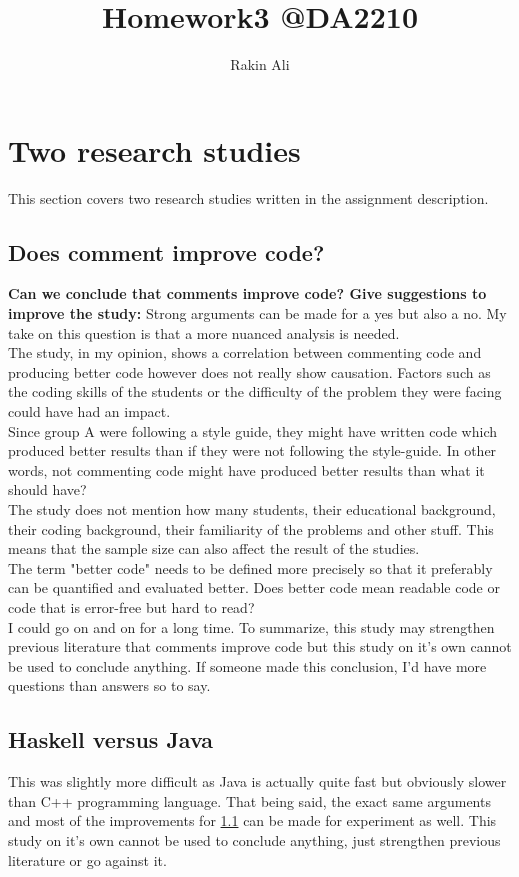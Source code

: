 \documentclass[a4paper,11pt]{article}
\title{Homework3 @DA2210}
\author{Rakin Ali}
\begin{document}
\maketitle

\tableofcontents

\newpage
\section{Two research studies} This section covers two research studies written in the assignment description.

\subsection{Does comment improve code?}
\label{Comments-code}
\textbf{Can we conclude that comments improve code? Give suggestions to improve the study:} Strong arguments can be made for a yes but also a no. My take on this question is that a more nuanced analysis is needed. \\
The study, in my opinion, shows a correlation between commenting code and producing better code however does not really show causation. Factors such as the coding skills of the students or the difficulty of the problem they were facing could have had an impact. \\
Since group A were following a style guide, they might have written code which produced better results than if they were not following the style-guide. In other words, not commenting code might have produced better results than what it should have?\\
The study does not mention how many students, their educational background, their coding background, their familiarity of the problems and other stuff. This means that the sample size can also affect the result of the studies. \\
The term "better code" needs to be defined more precisely so that it preferably can be quantified and evaluated better. Does better code mean readable code or code that is error-free but hard to read?\\
I could go on and on for a long time. To summarize, this study may strengthen previous literature that comments improve code but this study on it's own cannot be used to conclude anything. If someone made this conclusion, I'd have more questions than answers so to say. 

\subsection{Haskell versus Java}
This was slightly more difficult as Java is actually quite fast but obviously slower than C++ programming language. That being said, the exact same arguments and most of the improvements for  \ref{Comments-code} can be made for experiment as well. This study on it's own cannot be used to conclude anything, just strengthen previous literature or go against it.
\end{document}
